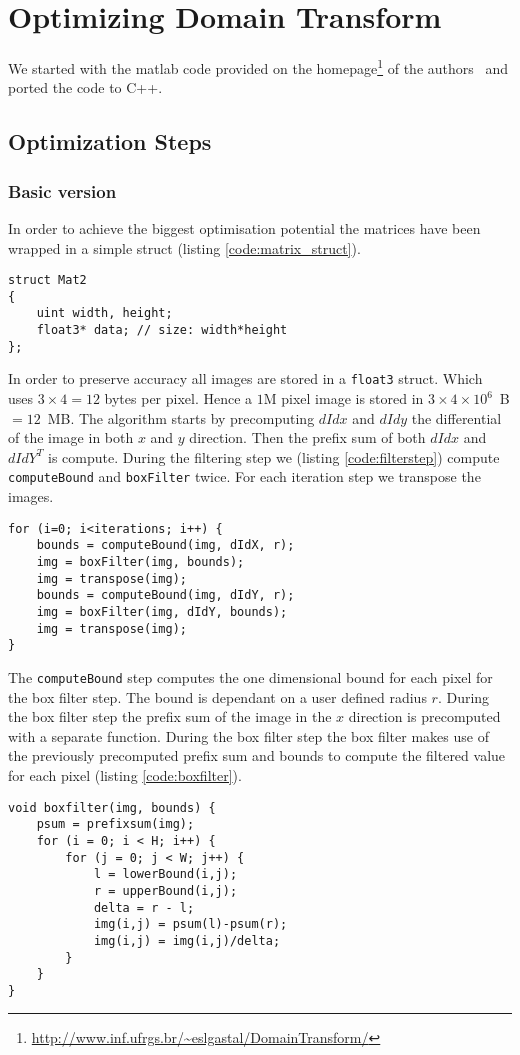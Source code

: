\section{Optimizing Domain Transform}
We started with the matlab code provided on the homepage\footnote{\url{http://www.inf.ufrgs.br/~eslgastal/DomainTransform/}} of the authors~\cite{GastalOliveira2011DomainTransform} and ported the code to C++. 
\subsection{Optimization Steps}
\subsubsection{Basic version}
In order to achieve the biggest optimisation potential the matrices have been wrapped in a simple struct (listing \ref{code:matrix_struct}).
\begin{lstlisting}[caption=Matrix struct,label=code:matrix_struct]
struct Mat2
{
    uint width, height;
    float3* data; // size: width*height
};
\end{lstlisting}
In order to preserve accuracy all images are stored in a \lstinline{float3} struct. Which uses $3\times 4 = 12$ bytes per pixel. Hence a $1$M pixel image is stored in $3\times 4\times 10^6$\ B $=12$\ MB.
The algorithm starts by precomputing $dIdx$ and $dIdy$ the differential of the image in both $x$ and $y$ direction. Then the prefix sum of both $dIdx$ and $dIdY^T$ is compute. 
During the filtering step we (listing \ref{code:filterstep}) compute \lstinline{computeBound} and \lstinline{boxFilter} twice. For each iteration step we transpose the images.
\begin{lstlisting}[caption=Filterstep,label=code:filterstep]
for (i=0; i<iterations; i++) {
    bounds = computeBound(img, dIdX, r);
    img = boxFilter(img, bounds);
    img = transpose(img);
    bounds = computeBound(img, dIdY, r);
    img = boxFilter(img, dIdY, bounds);
    img = transpose(img);
}
\end{lstlisting}
The \lstinline{computeBound} step computes the one dimensional bound for each pixel for the box filter step. The bound is dependant on a user defined radius $r$. 
During the box filter step the prefix sum of the image in the $x$ direction is precomputed with a separate function. During the box filter step the box filter makes use of the previously precomputed prefix sum and bounds to compute the filtered value for each pixel (listing \ref{code:boxfilter}).
\begin{lstlisting}[caption=Boxfilter step, label=code:boxfilter]
void boxfilter(img, bounds) {
    psum = prefixsum(img);
    for (i = 0; i < H; i++) {
        for (j = 0; j < W; j++) {
            l = lowerBound(i,j);
            r = upperBound(i,j);
            delta = r - l;
            img(i,j) = psum(l)-psum(r);
            img(i,j) = img(i,j)/delta;
        }
    }
}
\end{lstlisting}
